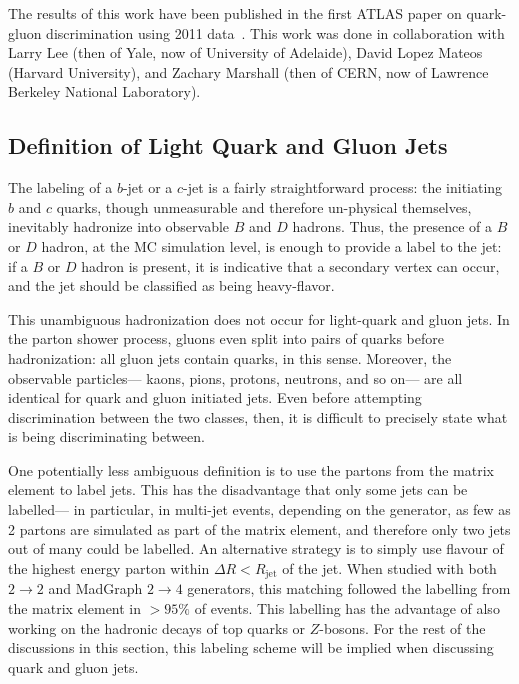 The results of this work have been published in the first ATLAS paper on quark-gluon discrimination using 2011 data~\cite{ATLASqg,Golling:1554107}. This work was done in collaboration with Larry Lee (then of Yale, now of University of Adelaide), David Lopez Mateos (Harvard University), and Zachary Marshall (then of CERN, now of Lawrence Berkeley National Laboratory).

\subsection{Definition of Light Quark and Gluon Jets}
\label{jet-reconstruction:qg:definition}

The labeling of a $b$-jet or a $c$-jet is a fairly straightforward process: the initiating $b$ and $c$ quarks, though unmeasurable and therefore un-physical themselves, inevitably hadronize into observable $B$ and $D$ hadrons. Thus, the presence of a $B$ or $D$ hadron, at the MC simulation level, is enough to provide a label to the jet: if a $B$ or $D$ hadron is present, it is indicative that a secondary vertex can occur, and the jet should be classified as being heavy-flavor.

This unambiguous hadronization does not occur for light-quark and gluon jets. In the parton shower process, gluons even split into pairs of quarks before hadronization: all gluon jets contain quarks, in this sense. Moreover, the observable particles--- kaons, pions, protons, neutrons, and so on--- are all identical for quark and gluon initiated jets. Even before attempting discrimination between the two classes, then, it is difficult to precisely state what is being discriminating between.

One potentially less ambiguous definition is to use the partons from the matrix element to label jets. This has the disadvantage that only some jets can be labelled--- in particular, in multi-jet events, depending on the generator, as few as 2 partons are simulated as part of the matrix element, and therefore only two jets out of many could be labelled. An alternative strategy is to simply use flavour of the highest energy parton within $\Delta R < R_\mathrm{jet}$ of the jet. When studied with both \Pythia $2\rightarrow2$ and MadGraph $2\rightarrow4$ generators, this matching followed the labelling from the matrix element in $> 95\%$ of events. This labelling has the advantage of also working on the hadronic decays of top quarks or $Z$-bosons. For the rest of the discussions in this section, this labeling scheme will be implied when discussing quark and gluon jets.

